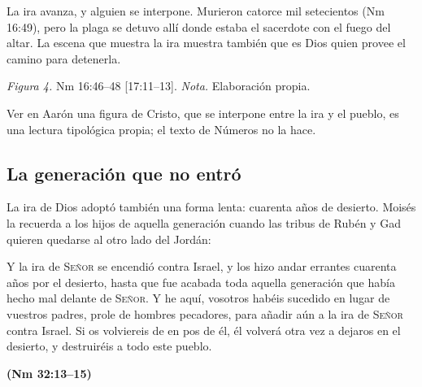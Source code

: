 \documentclass[11pt,letterpaper]{article}
\newcommand{\SENOR}{\textsc{Señor}}
\newcommand{\fuente}[1]{\par\hfill{\upshape\bfseries\small\textcolor{azul}{#1}}}
\begin{document}
La ira avanza, y alguien se interpone. Murieron catorce mil setecientos (Nm 16:49), pero la plaga se detuvo allí donde estaba el sacerdote con el fuego del altar. La escena que muestra la ira muestra también que es Dios quien provee el camino para detenerla.

\begin{center}
\par
{\footnotesize\color{gris}\textit{Figura 4.} Nm 16:46--48 [17:11--13]. \textit{Nota.} Elaboración propia.}
\end{center}

\begin{nota}[Precisión]
Ver en Aarón una figura de Cristo, que se interpone entre la ira y el pueblo, es una lectura tipológica propia; el texto de Números no la hace.
\end{nota}

\subsection{La generación que no entró}
La ira de Dios adoptó también una forma lenta: cuarenta años de desierto. Moisés la recuerda a los hijos de aquella generación cuando las tribus de Rubén y Gad quieren quedarse al otro lado del Jordán:

\begin{cita}Y la ira de \SENOR{} se encendió contra Israel, y los hizo andar errantes cuarenta años por el desierto, hasta que fue acabada toda aquella generación que había hecho mal delante de \SENOR. Y he aquí, vosotros habéis sucedido en lugar de vuestros padres, prole de hombres pecadores, para añadir aún a la ira de \SENOR{} contra Israel. Si os volviereis de en pos de él, él volverá otra vez a dejaros en el desierto, y destruiréis a todo este pueblo.\fuente{(Nm 32:13--15)}\end{cita}
\end{document}
